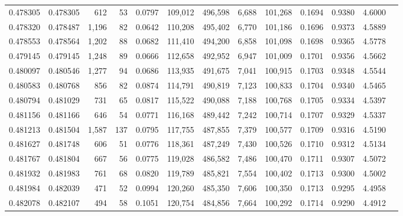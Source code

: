 \begin{tabular}{rrrrrrrrrrrrr}
0.478305 & 0.478305 &   612 &    53 &                                     0.0797 & 109,012 & 496,598 &   6,688 & 101,268 & 0.1694 & 0.9380 & 4.6000 \\
0.478320 & 0.478487 & 1,196 &    82 &                                     0.0642 & 110,208 & 495,402 &   6,770 & 101,186 & 0.1696 & 0.9373 & 4.5889 \\
0.478553 & 0.478564 & 1,202 &    88 &                                     0.0682 & 111,410 & 494,200 &   6,858 & 101,098 & 0.1698 & 0.9365 & 4.5778 \\
0.479145 & 0.479145 & 1,248 &    89 &                                     0.0666 & 112,658 & 492,952 &   6,947 & 101,009 & 0.1701 & 0.9356 & 4.5662 \\
0.480097 & 0.480546 & 1,277 &    94 &                                     0.0686 & 113,935 & 491,675 &   7,041 & 100,915 & 0.1703 & 0.9348 & 4.5544 \\
0.480583 & 0.480768 &   856 &    82 &                                     0.0874 & 114,791 & 490,819 &   7,123 & 100,833 & 0.1704 & 0.9340 & 4.5465 \\
0.480794 & 0.481029 &   731 &    65 &                                     0.0817 & 115,522 & 490,088 &   7,188 & 100,768 & 0.1705 & 0.9334 & 4.5397 \\
0.481156 & 0.481166 &   646 &    54 &                                     0.0771 & 116,168 & 489,442 &   7,242 & 100,714 & 0.1707 & 0.9329 & 4.5337 \\
0.481213 & 0.481504 & 1,587 &   137 &                                     0.0795 & 117,755 & 487,855 &   7,379 & 100,577 & 0.1709 & 0.9316 & 4.5190 \\
0.481627 & 0.481748 &   606 &    51 &                                     0.0776 & 118,361 & 487,249 &   7,430 & 100,526 & 0.1710 & 0.9312 & 4.5134 \\
0.481767 & 0.481804 &   667 &    56 &                                     0.0775 & 119,028 & 486,582 &   7,486 & 100,470 & 0.1711 & 0.9307 & 4.5072 \\
0.481932 & 0.481983 &   761 &    68 &                                     0.0820 & 119,789 & 485,821 &   7,554 & 100,402 & 0.1713 & 0.9300 & 4.5002 \\
0.481984 & 0.482039 &   471 &    52 &                                     0.0994 & 120,260 & 485,350 &   7,606 & 100,350 & 0.1713 & 0.9295 & 4.4958 \\
0.482078 & 0.482107 &   494 &    58 &                                     0.1051 & 120,754 & 484,856 &   7,664 & 100,292 & 0.1714 & 0.9290 & 4.4912 \\

\end{tabular}
